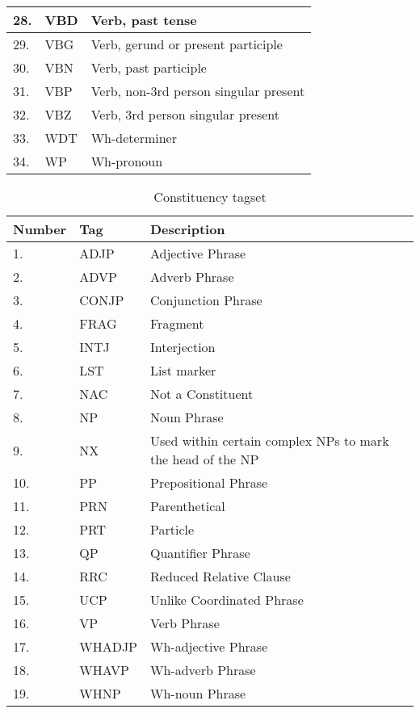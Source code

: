 \begin{table}[h]
{\begin{tabular}{| l | l | l |}
28. & 	VBD &	Verb, past tense \\ \hline
29. & 	VBG &	Verb, gerund or present participle \\ \hline
30. & 	VBN &	Verb, past participle \\ \hline
31. & 	VBP &	Verb, non-3rd person singular present \\ \hline
32. & 	VBZ &	Verb, 3rd person singular present \\ \hline
33. & 	WDT & Wh-determiner \\ \hline
34. & 	WP &	Wh-pronoun  \\ \hline
    \end{tabular}
}
\end{table}

\begin{table}[h]
	\centering
	      \caption{Constituency tagset}
     \label{table:AllConstituencyTags}
    \begin{tabular}{| l | l | l |}
    \hline
Number & Tag & Description \\ \hline
	\hline
1. & 	ADJP & Adjective Phrase \\ \hline
2. & 	ADVP & Adverb Phrase \\ \hline
3. & 	CONJP  &  Conjunction Phrase \\ \hline
4. & 	FRAG  & Fragment \\ \hline
5. & 	INTJ & Interjection \\ \hline
6. & 	LST  &	 List marker \\ \hline
7. & 	NAC & Not a Constituent \\ \hline
8. & 	NP &	Noun Phrase \\ \hline
9. & 	NX &	Used within certain complex NPs to mark the head of the NP \\ \hline
10. & 	PP &  Prepositional Phrase \\ \hline
11. & 	PRN &  Parenthetical \\ \hline
12. & 	PRT &	Particle \\ \hline
13. & 	QP & Quantifier Phrase\\ \hline
14. & 	RRC& 	 Reduced Relative Clause\\ \hline
15. & 	UCP & Unlike Coordinated Phrase \\ \hline
16. & 	VP & Verb Phrase \\ \hline
17. & 	WHADJP & Wh-adjective Phrase \\ \hline
18. & 	WHAVP & Wh-adverb Phrase \\ \hline
19. & 	WHNP & Wh-noun Phrase \\ \hline

\end{tabular}
\end{table}
